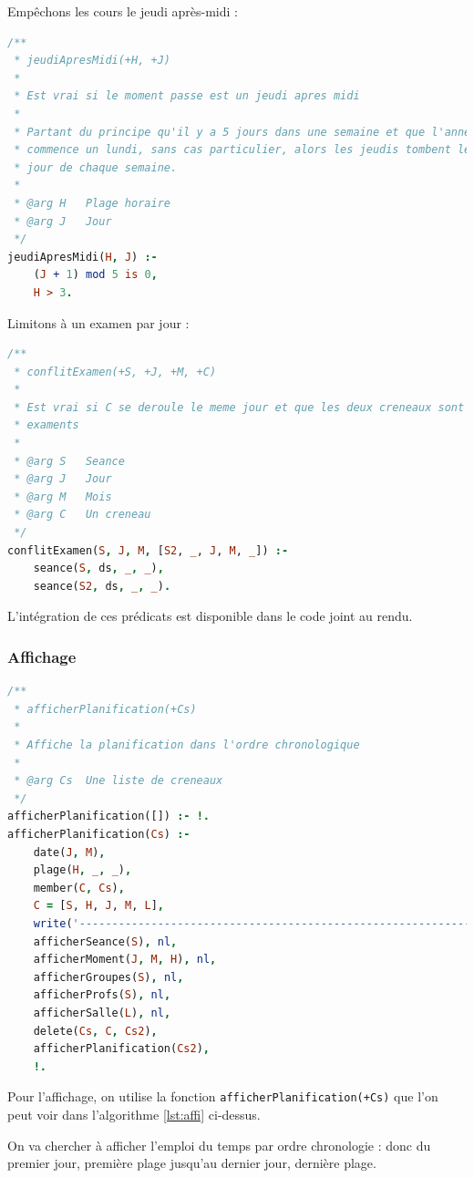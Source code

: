 Empêchons les cours le jeudi après-midi :

\begin{lstlisting}[language=Prolog, caption=Jeudi après-midi,
captionpos=b, label={lst:jeudi}]
/**
 * jeudiApresMidi(+H, +J)
 *
 * Est vrai si le moment passe est un jeudi apres midi
 *
 * Partant du principe qu'il y a 5 jours dans une semaine et que l'annee
 * commence un lundi, sans cas particulier, alors les jeudis tombent le 4eme
 * jour de chaque semaine.
 *
 * @arg H   Plage horaire
 * @arg J   Jour
 */
jeudiApresMidi(H, J) :-
    (J + 1) mod 5 is 0,
    H > 3.
\end{lstlisting}

Limitons à un examen par jour :

\begin{lstlisting}[language=Prolog, caption=Détection de conflit d'exament,
captionpos=b, label={lst:examen}]
/**
 * conflitExamen(+S, +J, +M, +C)
 *
 * Est vrai si C se deroule le meme jour et que les deux creneaux sont des
 * examents
 *
 * @arg S   Seance
 * @arg J   Jour
 * @arg M   Mois
 * @arg C   Un creneau
 */
conflitExamen(S, J, M, [S2, _, J, M, _]) :-
    seance(S, ds, _, _),
    seance(S2, ds, _, _).
\end{lstlisting}

L'intégration de ces prédicats est disponible dans le code joint au rendu.

\subsubsection{Affichage}
\begin{lstlisting}[language=Prolog, caption=Affichage, captionpos=b,
label={lst:affi}]
/**
 * afficherPlanification(+Cs)
 *
 * Affiche la planification dans l'ordre chronologique
 *
 * @arg Cs  Une liste de creneaux
 */
afficherPlanification([]) :- !.
afficherPlanification(Cs) :-
    date(J, M),
    plage(H, _, _),
    member(C, Cs),
    C = [S, H, J, M, L],
    write('--------------------------------------------------------------'), nl,
    afficherSeance(S), nl,
    afficherMoment(J, M, H), nl,
    afficherGroupes(S), nl,
    afficherProfs(S), nl,
    afficherSalle(L), nl,
    delete(Cs, C, Cs2),
    afficherPlanification(Cs2),
    !.
\end{lstlisting}

Pour l'affichage, on utilise la fonction \texttt{afficherPlanification(+Cs)} que l'on peut voir dans l'algorithme \ref{lst:affi} ci-dessus.

On va chercher à afficher l'emploi du temps par ordre chronologie : donc du premier jour, première plage jusqu'au dernier jour, dernière plage.

